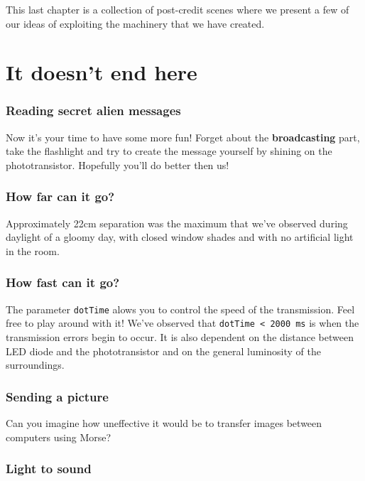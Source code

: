 \documentclass[12pt]{report}
\begin{document}
This last chapter is a collection of post-credit scenes where we present a few of our ideas of exploiting the machinery that we have created.

\section{It doesn't end here}



\subsubsection{Reading secret alien messages}

Now it's your time to have some more fun! Forget about the \textbf{broadcasting} part, take the flashlight and try to create the message yourself by shining on the phototransistor. Hopefully you'll do better then us!


\subsubsection{How far can it go?}

Approximately 22cm separation was the maximum that we've observed during daylight of a gloomy day, with closed window shades and with no artificial light in the room. 


\subsubsection{How fast can it go?}

The parameter \verb|dotTime| alows you to control the speed of the transmission. Feel free to play around with it! We've observed that \verb|dotTime < 2000 ms| is when the transmission errors begin to occur. It is also dependent on the distance between LED diode and the phototransistor and on the general luminosity of the surroundings.


\subsubsection{Sending a picture}

Can you imagine how uneffective it would be to transfer images between computers using Morse?

\subsubsection{Light to sound}
\end{document}
